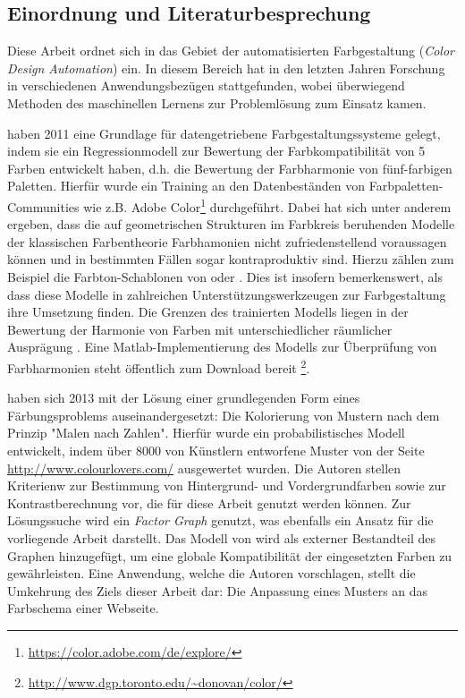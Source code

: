 \documentclass[11pt, bibliography=totoc]{scrartcl}
\begin{document}
\subsection{Einordnung und Literaturbesprechung}
\label{sec:literatur}

Diese Arbeit ordnet sich in das Gebiet der automatisierten Farbgestaltung (\emph{Color Design Automation}) ein. In diesem Bereich hat in den letzten Jahren Forschung in verschiedenen Anwendungsbezügen stattgefunden, wobei überwiegend Methoden des maschinellen Lernens zur Problemlösung zum Einsatz kamen.

\citet{colorcomp} haben 2011 eine Grundlage für datengetriebene Farbgestaltungssysteme gelegt, indem sie ein Regressionmodell zur Bewertung der Farbkompatibilität von 5 Farben entwickelt haben, d.h. die Bewertung der Farbharmonie von fünf-farbigen Paletten. Hierfür wurde ein Training an den Datenbeständen von Farbpaletten-Communities wie z.B. Adobe Color\footnote{\url{https://color.adobe.com/de/explore/}} durchgeführt. Dabei hat sich unter anderem ergeben, dass die auf geometrischen Strukturen im Farbkreis beruhenden Modelle der klassischen Farbentheorie Farbhamonien nicht zufriedenstellend voraussagen können und in bestimmten Fällen sogar kontraproduktiv sind. Hierzu zählen zum Beispiel die Farbton-Schablonen von \citet{itten} oder \citet{munsell}. Dies ist insofern bemerkenswert, als dass diese Modelle in zahlreichen Unterstützungswerkzeugen zur Farbgestaltung ihre Umsetzung finden. Die Grenzen des trainierten Modells liegen in der Bewertung der Harmonie von Farben mit unterschiedlicher räumlicher Ausprägung \citep{webpage, patterns}. Eine Matlab-Implementierung des Modells zur Überprüfung von Farbharmonien steht öffentlich zum Download bereit \footnote{\url{http://www.dgp.toronto.edu/~donovan/color/}}.

\citet{patterns} haben sich 2013 mit der Lösung einer grundlegenden Form eines Färbungsproblems auseinandergesetzt: Die Kolorierung von Mustern nach dem Prinzip "Malen nach Zahlen". Hierfür wurde ein probabilistisches Modell entwickelt, indem über 8000 von Künstlern entworfene Muster von der Seite \url{http://www.colourlovers.com/} ausgewertet wurden. Die Autoren stellen Kriterienw zur Bestimmung von Hintergrund- und Vordergrundfarben sowie zur Kontrastberechnung vor, die für diese Arbeit genutzt werden können. Zur Lösungssuche wird ein \emph{Factor Graph} genutzt, was ebenfalls ein Ansatz für die vorliegende Arbeit darstellt. Das Modell von \citet{colorcomp} wird als externer Bestandteil des Graphen hinzugefügt, um eine globale Kompatibilität der eingesetzten Farben zu gewährleisten. Eine Anwendung, welche die Autoren vorschlagen, stellt die Umkehrung des Ziels dieser Arbeit dar: Die Anpassung eines Musters an das Farbschema einer Webseite.
\end{document}
